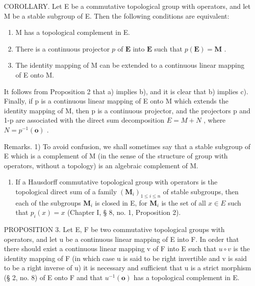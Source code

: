 COROLLARY. Let E be a commutative topological group with operators, and let M be a stable subgroup of E. Then the following conditions are equivalent:

\begin{enumerate}
\def\labelenumi{\alph{enumi})}
\item
  M has a topological complement in E.
\item
  There is a continuous projector \(p\) of \(\mathbf{E}\) into \(\mathbf{E}\) such that \(p(\mathbf{E}) = \mathbf{M}\) .
\item
  The identity mapping of M can be extended to a continuous linear mapping of E onto M.
\end{enumerate}

It follows from Proposition 2 that a) implies b), and it is clear that b) implies c). Finally, if p is a continuous linear mapping of E onto M which extends the identity mapping of M, then p is a continuous projector, and the projectors p and 1-p are associated with the direct sum decomposition \(E = M + N\) , where \(N = p^{-1}(\mathbf{o})\) .

Remarks. 1) To avoid confusion, we shall sometimes say that a stable subgroup of E which is a complement of M (in the sense of the structure of group with operators, without a topology) is an algebraic complement of M.

\begin{enumerate}
\def\labelenumi{\arabic{enumi})}
\setcounter{enumi}{1}
\tightlist
\item
  If a Hausdorff commutative topological group with operators is the topological direct sum of a family \((\mathbf{M}_i)_{1\leqslant i\leqslant n}\) of stable subgroups, then each of the subgroups \(\mathbf{M}_i\) is closed in E, for \(\mathbf{M}_i\) is the set of all \(x\in E\) such that \(p_i(x) = x\) (Chapter I, § 8, no. 1, Proposition 2).
\end{enumerate}

PROPOSITION 3. Let E, F be two commutative topological groups with operators, and let u be a continuous linear mapping of E into F. In order that there should exist a continuous linear mapping v of F into E such that \(u \circ v\) is the identity mapping of F (in which case u is said to be right invertible and v is said to be a right inverse of u) it is necessary and sufficient that u is a strict morphism (§ 2, no. 8) of E onto F and that \(u^{-1}(\mathbf{o})\) has a topological complement in E.

